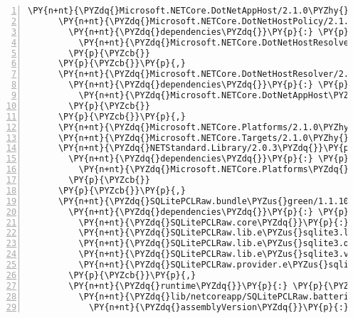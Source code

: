 \begin{Verbatim}[commandchars=\\\{\},numbers=left,firstnumber=1,stepnumber=1,numberblanklines=0]
      \PY{n+nt}{\PYZdq{}Microsoft.NETCore.DotNetAppHost/2.1.0\PYZhy{}rc1\PYZdq{}}\PY{p}{:} \PY{p}{\PYZob{}}\PY{p}{\PYZcb{}}\PY{p}{,}
      \PY{n+nt}{\PYZdq{}Microsoft.NETCore.DotNetHostPolicy/2.1.0\PYZhy{}rc1\PYZdq{}}\PY{p}{:} \PY{p}{\PYZob{}}
        \PY{n+nt}{\PYZdq{}dependencies\PYZdq{}}\PY{p}{:} \PY{p}{\PYZob{}}
          \PY{n+nt}{\PYZdq{}Microsoft.NETCore.DotNetHostResolver\PYZdq{}}\PY{p}{:} \PY{l+s+s2}{\PYZdq{}2.1.0\PYZhy{}rc1\PYZdq{}}
        \PY{p}{\PYZcb{}}
      \PY{p}{\PYZcb{}}\PY{p}{,}
      \PY{n+nt}{\PYZdq{}Microsoft.NETCore.DotNetHostResolver/2.1.0\PYZhy{}rc1\PYZdq{}}\PY{p}{:} \PY{p}{\PYZob{}}
        \PY{n+nt}{\PYZdq{}dependencies\PYZdq{}}\PY{p}{:} \PY{p}{\PYZob{}}
          \PY{n+nt}{\PYZdq{}Microsoft.NETCore.DotNetAppHost\PYZdq{}}\PY{p}{:} \PY{l+s+s2}{\PYZdq{}2.1.0\PYZhy{}rc1\PYZdq{}}
        \PY{p}{\PYZcb{}}
      \PY{p}{\PYZcb{}}\PY{p}{,}
      \PY{n+nt}{\PYZdq{}Microsoft.NETCore.Platforms/2.1.0\PYZhy{}rc1\PYZdq{}}\PY{p}{:} \PY{p}{\PYZob{}}\PY{p}{\PYZcb{}}\PY{p}{,}
      \PY{n+nt}{\PYZdq{}Microsoft.NETCore.Targets/2.1.0\PYZhy{}rc1\PYZdq{}}\PY{p}{:} \PY{p}{\PYZob{}}\PY{p}{\PYZcb{}}\PY{p}{,}
      \PY{n+nt}{\PYZdq{}NETStandard.Library/2.0.3\PYZdq{}}\PY{p}{:} \PY{p}{\PYZob{}}
        \PY{n+nt}{\PYZdq{}dependencies\PYZdq{}}\PY{p}{:} \PY{p}{\PYZob{}}
          \PY{n+nt}{\PYZdq{}Microsoft.NETCore.Platforms\PYZdq{}}\PY{p}{:} \PY{l+s+s2}{\PYZdq{}2.1.0\PYZhy{}rc1\PYZdq{}}
        \PY{p}{\PYZcb{}}
      \PY{p}{\PYZcb{}}\PY{p}{,}
      \PY{n+nt}{\PYZdq{}SQLitePCLRaw.bundle\PYZus{}green/1.1.10\PYZdq{}}\PY{p}{:} \PY{p}{\PYZob{}}
        \PY{n+nt}{\PYZdq{}dependencies\PYZdq{}}\PY{p}{:} \PY{p}{\PYZob{}}
          \PY{n+nt}{\PYZdq{}SQLitePCLRaw.core\PYZdq{}}\PY{p}{:} \PY{l+s+s2}{\PYZdq{}1.1.10\PYZdq{}}\PY{p}{,}
          \PY{n+nt}{\PYZdq{}SQLitePCLRaw.lib.e\PYZus{}sqlite3.linux\PYZdq{}}\PY{p}{:} \PY{l+s+s2}{\PYZdq{}1.1.10\PYZdq{}}\PY{p}{,}
          \PY{n+nt}{\PYZdq{}SQLitePCLRaw.lib.e\PYZus{}sqlite3.osx\PYZdq{}}\PY{p}{:} \PY{l+s+s2}{\PYZdq{}1.1.10\PYZdq{}}\PY{p}{,}
          \PY{n+nt}{\PYZdq{}SQLitePCLRaw.lib.e\PYZus{}sqlite3.v110\PYZus{}xp\PYZdq{}}\PY{p}{:} \PY{l+s+s2}{\PYZdq{}1.1.10\PYZdq{}}\PY{p}{,}
          \PY{n+nt}{\PYZdq{}SQLitePCLRaw.provider.e\PYZus{}sqlite3.netstandard11\PYZdq{}}\PY{p}{:} \PY{l+s+s2}{\PYZdq{}1.1.10\PYZdq{}}
        \PY{p}{\PYZcb{}}\PY{p}{,}
        \PY{n+nt}{\PYZdq{}runtime\PYZdq{}}\PY{p}{:} \PY{p}{\PYZob{}}
          \PY{n+nt}{\PYZdq{}lib/netcoreapp/SQLitePCLRaw.batteries\PYZus{}green.dll\PYZdq{}}\PY{p}{:} \PY{p}{\PYZob{}}
            \PY{n+nt}{\PYZdq{}assemblyVersion\PYZdq{}}\PY{p}{:} \PY{l+s+s2}{\PYZdq{}1.1.10.86\PYZdq{}}\PY{p}{,}

\end{Verbatim}
